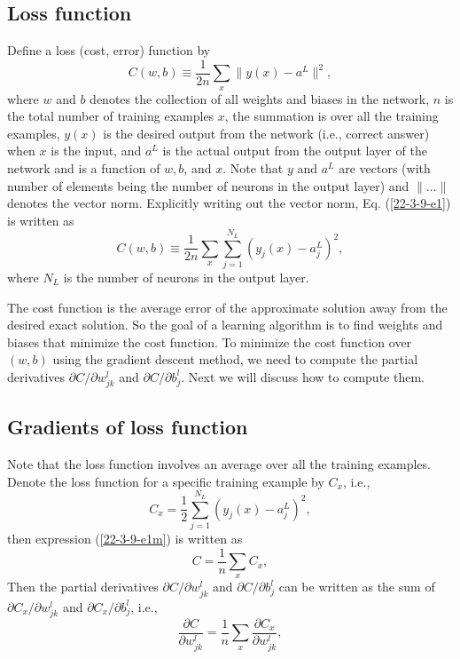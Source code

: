 \documentclass{article}
\begin{document}
\subsection{Loss function}

Define a loss (cost, error) function by
\begin{equation}
  \label{22-3-9-e1} C (w, b) \equiv \frac{1}{2 n} \sum_x \| y (x) - a^L \|^2,
\end{equation}
where $w$ and $b$ denotes the collection of all weights and biases in the
network, $n$ is the total number of training examples $x$, the summation is
over all the training examples, $y (x)$ is the desired output from the network
(i.e., correct answer) when $x$ is the input, and $a^L$ is the actual output
from the output layer of the network and is a function of $w, b$, and $x$.
Note that $y$ and $a^L$ are vectors (with number of elements being the number
of neurons in the output layer) and $\| \ldots \|$ denotes the vector norm.
Explicitly writing out the vector norm, Eq. (\ref{22-3-9-e1}) is written as
\begin{equation}
  \label{22-3-9-e1m} C (w, b) \equiv \frac{1}{2 n} \sum_x \sum^{N_L}_{j = 1}
  (y_j (x) - a^L_j)^2,
\end{equation}
where $N_L$ is the number of neurons in the output layer.

The cost function is the average error of the approximate solution away from
the desired exact solution. So the goal of a learning algorithm is to find
weights and biases that minimize the cost function. To minimize the cost
function over $(w, b)$ using the gradient descent method, we need to compute
the partial derivatives $\partial C / \partial w^l_{j k}$ and $\partial C /
\partial b^l_j$. Next we will discuss how to compute them.

\subsection{Gradients of loss function}

Note that the loss function involves an average over all the training
examples. Denote the loss function for a specific training example by $C_x$,
i.e.,
\begin{equation}
  \label{22-3-11-a6} C_x = \frac{1}{2} \sum^{N_L}_{j = 1} (y_j (x) - a^L_j)^2,
\end{equation}
then expression (\ref{22-3-9-e1m}) is written as
\begin{equation}
  C = \frac{1}{n} \sum_x C_x,
\end{equation}
Then the partial derivatives $\partial C / \partial w^l_{j k}$ and $\partial C
/ \partial b^l_j$ can be written as the sum of $\partial C_x / \partial w^l_{j
k}$ and $\partial C_x / \partial b^l_j$, i.e.,
\begin{equation}
  \label{22-3-11-a3} \frac{\partial C}{\partial w_{j k}^l} = \frac{1}{n}
  \sum_x \frac{\partial C_x}{\partial w_{j k}^l},
\end{equation}
\end{document}
